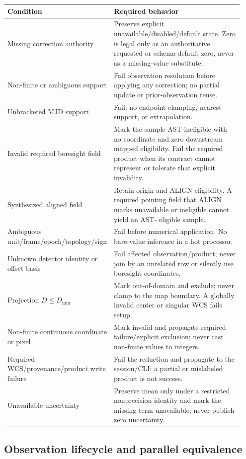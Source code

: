 \documentclass[11pt]{article}
\begin{document}
\begin{longtable}{>{\raggedright\arraybackslash}p{0.30\linewidth}
                  >{\raggedright\arraybackslash}p{0.64\linewidth}}
\toprule
Condition & Required behavior \\
\midrule
\endhead
Missing correction authority & Preserve explicit unavailable/disabled/default
state.  Zero is legal only as an authoritative requested or schema-default
zero, never as a missing-value substitute. \\
Non-finite or ambiguous support & Fail observation resolution before applying
any correction; no partial update or prior-observation reuse. \\
Unbracketed MJD support & Fail; no endpoint clamping, nearest support, or
extrapolation. \\
Invalid required boresight field & Mark the sample AST-ineligible with no
coordinate and zero downstream mapped eligibility.  Fail the required product
when its contract cannot represent or tolerate that explicit invalidity. \\
Synthesized aligned field & Retain origin and ALIGN eligibility.  A required
pointing field that ALIGN marks unavailable or ineligible cannot yield an AST-
eligible sample. \\
Ambiguous unit/frame/epoch/topology/sign & Fail before numerical application.
No bare-value inference in a hot processor. \\
Unknown detector identity or offset basis & Fail affected observation/product;
never join by an unrelated row or silently use boresight coordinates. \\
Projection $D\le D_{\min}$ & Mark out-of-domain and exclude; never clamp to
the map boundary.  A globally invalid center or singular WCS fails setup. \\
Non-finite continuous coordinate or pixel & Mark invalid and propagate required
failure/explicit exclusion; never cast non-finite values to integers. \\
Required WCS/provenance/product write failure & Fail the reduction and
propagate to the session/CLI; a partial or mislabeled product is not success. \\
Unavailable uncertainty & Preserve mean only under a restricted nonprecision
identity and mark the missing term unavailable; never publish zero uncertainty.
\\
\bottomrule
\end{longtable}

\subsection{Observation lifecycle and parallel equivalence}
\end{document}
